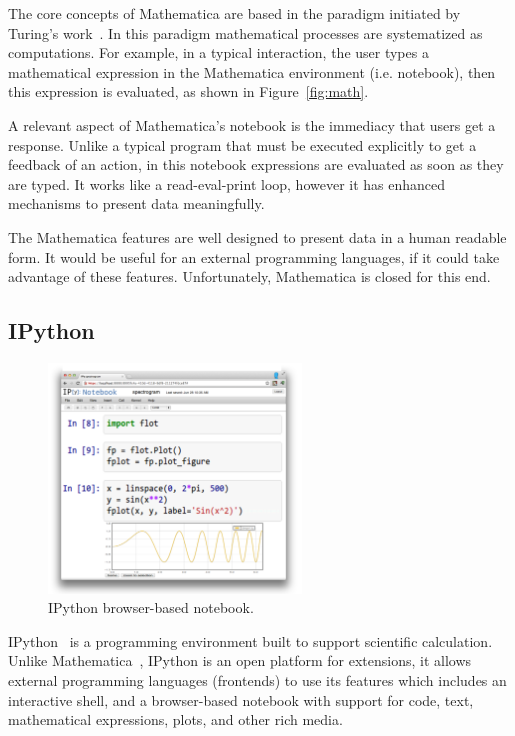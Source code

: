 The core concepts of Mathematica are based in the paradigm initiated by Turing's work~\cite{wolfram2003wolfram}. In this paradigm mathematical processes are systematized as computations. For example, in a typical interaction, the user types a mathematical expression in the Mathematica environment (i.e. notebook), then this expression is evaluated, as shown in Figure~\ref{fig:math}.  

A relevant aspect of Mathematica's notebook is the immediacy that users get a response. Unlike a typical program that must be executed explicitly to get a feedback of an action, in this notebook expressions are evaluated as soon as they are typed. It works like a read-eval-print loop, however it has enhanced mechanisms to present data meaningfully.

The Mathematica features are well designed to present data in a human readable form. It would be useful for an external programming languages, if it could take advantage of these features. Unfortunately, Mathematica is closed for this end.
\subsection{IPython}
\label{subsec:ipython}
\begin{figure}
  \vspace{-40pt}
  \begin{center}
    \includegraphics[width=0.6\textwidth]{images/ipython-zoom}
  \end{center}
  \vspace{-25pt}
 \caption{IPython browser-based notebook.}  
    \vspace{-15pt}
    \label{fig:ipython}
\end{figure}
IPython~\cite{PER-GRA:2007} is a programming environment built to support scientific calculation. Unlike Mathematica~\cite{wolfram1991mathematica},  IPython is an open platform for extensions, it allows external programming languages (frontends) to use its features which includes an interactive shell, and a browser-based notebook with support for code, text, mathematical expressions, plots, and other rich media. 

